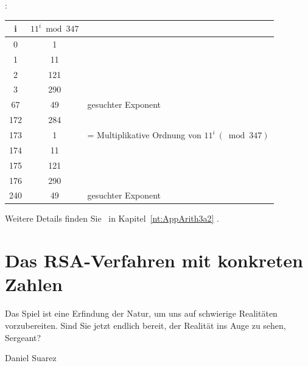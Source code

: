 \begin{refsegment}
\begin{remark}{:}
{\begin{tabular}{|c|c|l|}
\hline
i  & $11^i \bmod 347$ &\\
\hline
      0  &          1   &\\
      1  &         11   &\\
      2  &        121   &\\
      3  &        290   &\\
     67  &         49   & gesuchter Exponent\\
    172  &        284   &\\
    173  &          1   &= Multiplikative Ordnung von $11^i ~(\bmod 347)$\\
    174  &         11   &\\
    175  &        121   &\\
    176  &        290   &\\
    240  &         49   & gesuchter Exponent\\
\hline
\end{tabular}

 Weitere Details finden Sie~
in Kapitel~\ref{nt:AppArith3a2} \glqq {}\grqq.
}

\end{remark}



\hypertarget{RSAKonkret}{}%
\hypertarget{Chapter_ElementaryNT_12}{}%
\section[Das RSA-Verfahren mit konkreten Zahlen]
	{Das RSA-Verfahren mit konkreten Zahlen\footnotemark}
\label{rsaconcrete}

\begin{ctsquote}
\glqq Das Spiel ist eine Erfindung der Natur, um uns auf schwierige Realitäten vorzubereiten. Sind Sie jetzt endlich bereit, der Realität ins Auge zu sehen, Sergeant?\grqq
\caption[Daniel Suarez]{Daniel Suarez\footnotemark}
\end{ctsquote}
\addtocounter{footnote}{0}


\end{refsegment}
